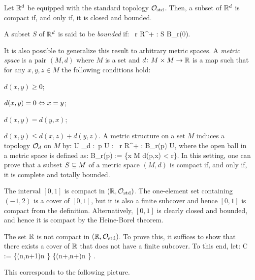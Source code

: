 Let $\mathbb{R}^d$ be equipped with the standard topology $\mathcal{O}_\mathrm{std}$. Then, a subset of $\mathbb{R}^d$ is compact if, and only if, it is closed and bounded.
\et

A subset $S$ of $\mathbb{R}^d$ is said to be \emph{bounded} if:
\bse
\exists \, r \in R^+ : S \se B_r(0). 
\ese

\br
It is also possible to generalize this result to arbitrary metric spaces. A \emph{metric space} is a pair $(M,d)$ where $M$ is a set and $d\colon M\times M \to \mathbb{R}$ is a map such that for any $x,y,z \in M$ the following conditions hold:
\ben
\item[i)] $d(x,y) \geq 0$;
\item[ii)] $d(x,y) = 0 \Leftrightarrow x = y$;
\item[iii)] $d(x,y) = d(y,x) $;
\item[iv)] $d(x,y)\leq d(x,z)+d(y,z)$.
\een
A metric structure on a set $M$ induces a topology $\mathcal{O}_d$ on $M$ by:
\bse
U \in \cO_d :\eqv \forall \, p \in U : \exists \, r \in R^+ : B_r(p) \se U,
\ese
where the open ball in a metric space is defined as:
\bse
B_r(p) := \{x \in M \mid d(p,x) < r\}.
\ese
In this setting, one can prove that a subset $S\subseteq M$ of a metric space $(M,d)$ is compact if, and only if, it is complete and totally bounded.
\er

\be
The interval $[0,1]$ is compact in $(\mathbb{R},\mathcal{O}_\mathrm{std})$. The one-element set containing $(-1,2)$ is a cover of $[0,1]$, but it is also a finite subcover and hence $[0,1]$ is compact from the definition. Alternatively, $[0,1]$ is clearly closed and bounded, and hence it is compact by the Heine-Borel theorem.
\ee

\be
The set $\mathbb{R}$ is not compact in $(\mathbb{R},\mathcal{O}_\mathrm{std})$. To prove this, it suffices to show that there exists a cover of $\mathbb{R}$ that does not have a finite subcover. To this end, let:
\bse
C := \{(n,n+1)\mid n \in \Z\} \cup \{(n+,n+)\mid n \in \Z\} .
\ese

This corresponds to the following picture.

\begin{figure}[h!]
\centering
{}
\end{figure}

